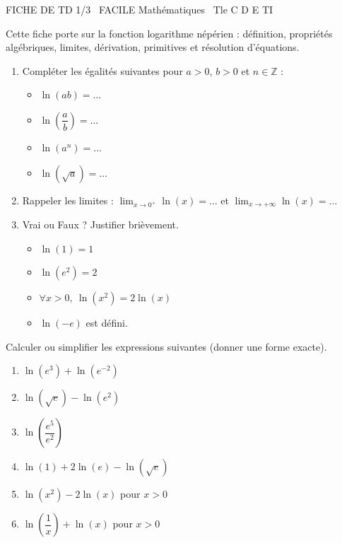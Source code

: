 \documentclass[11pt]{article}
\begin{document}
\begin{tcolorbox}[enhanced,colback=popink,colframe=popink,arc=10pt,boxrule=0pt,left=12pt,right=12pt,top=9pt,bottom=9pt]
{\color{white}\popxbold\small FICHE DE TD 1/3 \textbullet\ FACILE \hfill Mathématiques \textbullet\ Tle C D E TI\par}
\end{tcolorbox}
\vspace{4pt}
Cette fiche porte sur la fonction logarithme népérien : définition, propriétés algébriques, limites, dérivation, primitives et résolution d'équations.

\begin{exercice}
\begin{enumerate}
    \item Compléter les égalités suivantes pour $a>0$, $b>0$ et $n \in \mathbb{Z}$ :
    \begin{itemize}
        \item $\ln(ab) = \dots$
        \item $\ln\left(\dfrac{a}{b}\right) = \dots$
        \item $\ln(a^n) = \dots$
        \item $\ln(\sqrt{a}) = \dots$
    \end{itemize}
    \item Rappeler les limites : $\lim_{x \to 0^+} \ln(x) = \dots$ et $\lim_{x \to +\infty} \ln(x) = \dots$
    \item Vrai ou Faux ? Justifier brièvement.
    \begin{itemize}
        \item $\ln(1) = 1$
        \item $\ln(e^2) = 2$
        \item $\forall x>0,\ \ln(x^2) = 2\ln(x)$
        \item $\ln(-e)$ est défini.
    \end{itemize}
\end{enumerate}
\end{exercice}

\begin{exercice}
Calculer ou simplifier les expressions suivantes (donner une forme exacte).
\begin{enumerate}
    \item $\ln(e^3) + \ln(e^{-2})$
    \item $\ln(\sqrt{e}) - \ln(e^2)$
    \item $\ln\left(\dfrac{e^5}{e^2}\right)$
    \item $\ln(1) + 2\ln(e) - \ln(\sqrt{e})$
    \item $\ln(x^2) - 2\ln(x)$ pour $x>0$
    \item $\ln\left(\dfrac{1}{x}\right) + \ln(x)$ pour $x>0$
\end{enumerate}
\end{exercice}
\end{document}
